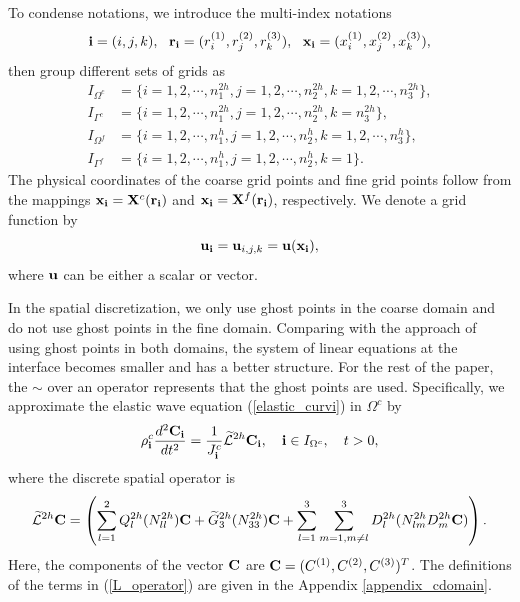  To condense notations, we introduce the multi-index notations
\[{\bf i} = (i,j,k),\ \ {\bf r}_{\bf i} = (r^{(1)}_i,r^{(2)}_j,r^{(3)}_k),\ \ {\bf x}_{\bf i} = (x^{(1)}_i,x^{(2)}_j,x^{(3)}_k),\]
then group different sets of grids as
\begin{equation*}
\begin{aligned}
	I_{\Omega^c} &= \{i = 1,2,\cdots,n_1^{2h}, j = 1,2,\cdots,n_2^{2h}, k = 1,2,\cdots,n_3^{2h}\},\\
	I_{\Gamma^c} & = \{i = 1,2,\cdots,n_1^{2h}, j = 1,2,\cdots,n_2^{2h}, k = n_3^{2h}\},\\
	I_{\Omega^f} &= \{i = 1,2,\cdots,n_1^h, j = 1,2,\cdots,n_2^h, k = 1,2,\cdots,n_3^h\},\\
	I_{\Gamma^f} & = \{i = 1,2,\cdots,n_1^{h}, j = 1,2,\cdots,n_2^{h}, k = 1\}.
\end{aligned}	
\end{equation*}
The physical coordinates of the coarse grid points and fine grid points follow from the mappings ${\bf x}_{\bf i} = {\bf X}^c({\bf r}_{\bf i})$ and ${\bf x}_{\bf i} = {\bf X}^f({\bf r}_{\bf i})$, respectively. We denote a grid function by
\[{\bf u}_{\bf i} = {\bf u}_{i,j,k} = {\bf u}({\bf x}_{\bf i}),\]
where ${\bf u}$ can be either a scalar or vector. 

{\color{red}In the spatial discretization, we only use ghost points in the coarse domain and do not use ghost points in the fine domain. Comparing with the approach of using ghost points in both domains, the system of linear equations at the interface becomes smaller and has a better structure. For the rest of the paper, the $\sim$ over an operator represents that the ghost points are used. Specifically,} we approximate the elastic wave equation (\ref{elastic_curvi}) in $\Omega^c$ by
\begin{equation}\label{elastic_semi_c}
{\rho}_{\bf i}^{c}\frac{d^2{{\bf C}_{\bf i}}}{dt^2} = \frac{1}{J^c_{\bf i}}\wt{\mathcal{L}}^{2h} {{\bf C}}_{\bf i},\quad {\bf i}\in I_{\Omega^c},\quad t>0,
\end{equation}
where the discrete spatial operator is
\begin{equation}\label{L_operator}
\wt{\mathcal{L}}^{2h} {{\bf C}} = \left(\sum_{l=1}^2{Q}_l^{2h}({N}_{ll}^{2h}){\bf C}+\wt{{G}}_3^{2h}({N}_{33}^{2h}){{\bf C}}+\sum_{l=1}^3\sum_{m=1,m\neq l}^3{D}_l^{2h}({N}_{lm}^{2h}{D}_m^{2h}{\bf C})\right).
\end{equation}
Here, the components of the vector ${\bf C}$ are ${\bf C} = (C^{(1)}, C^{(2)}, C^{(3)})^T$. {\color{red} The definitions of the terms in (\ref{L_operator}) are given in the Appendix \ref{appendix_cdomain}.}

